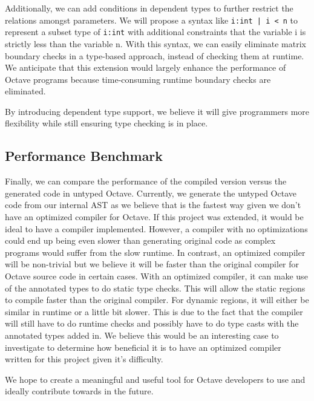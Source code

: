 Additionally, we can add conditions in dependent types to further restrict the relations amongst parameters. We will propose a syntax like {\tt i:int | i < n} to represent a subset type of {\tt i:int} with additional constraints that the variable i is strictly less than the variable n. With this syntax, we can easily eliminate matrix boundary checks in a type-based approach, instead of checking them at runtime. We anticipate that this extension would largely enhance the performance of Octave programs because time-consuming runtime boundary checks are eliminated.

By introducing dependent type support, we believe it will give programmers more flexibility while still ensuring type checking is in place. 

\subsection{Performance Benchmark}
Finally, we can compare the performance of the compiled version versus the generated code in untyped Octave. Currently, we generate the untyped Octave code from our internal AST as we believe that is the fastest way given we don't have an optimized compiler for Octave. If this project was extended, it would be ideal to have a compiler implemented. However, a compiler with no optimizations could end up being even slower than generating original code as complex programs would suffer from the slow runtime. In contrast, an optimized compiler will be non-trivial but we believe it will be faster than the original compiler for Octave source code in certain cases. With an optimized compiler, it can make use of the annotated types to do static type checks. This will allow the static regions to compile faster than the original compiler. For dynamic regions, it will either be similar in runtime or a little bit slower. This is due to the fact that the compiler will still have to do runtime checks and possibly have to do type casts with the annotated types added in. We believe this would be an interesting case to investigate to determine how beneficial it is to have an optimized compiler written for this project given it's difficulty. 

We hope to create a meaningful and useful tool for Octave developers to use and ideally contribute towards in the future.

